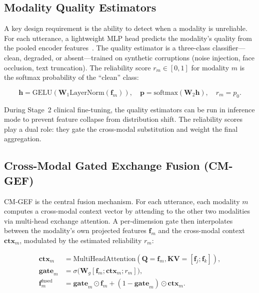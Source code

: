 \documentclass{article}
\begin{document}
\subsection{Modality Quality Estimators}

A key design requirement is the ability to detect when a modality is unreliable. For each
utterance, a lightweight MLP head predicts the modality's quality from the pooled encoder
features~\cite{amte2025}. The quality estimator is a three-class classifier---clean,
degraded, or absent---trained on synthetic corruptions (noise injection, face occlusion,
text truncation). The reliability score $r_m \in [0, 1]$ for modality $m$ is the
softmax probability of the ``clean'' class:

\begin{equation}
  \mathbf{h} = \text{GELU}(\mathbf{W}_1 \text{LayerNorm}(\mathbf{f}_m)),
  \quad
  \mathbf{p} = \text{softmax}(\mathbf{W}_2 \mathbf{h}),
  \quad
  r_m = p_0.
  \label{eq:quality}
\end{equation}

During Stage~2 clinical fine-tuning, the quality estimators can be run in inference mode
to prevent feature collapse from distribution shift. The reliability scores play a dual
role: they gate the cross-modal substitution and weight the final aggregation.

\subsection{Cross-Modal Gated Exchange Fusion (CM-GEF)}
\label{sec:cmgef}

CM-GEF is the central fusion mechanism. For each utterance, each modality $m$ computes a
cross-modal context vector by attending to the other two modalities via multi-head exchange
attention. A per-dimension gate then interpolates between the modality's own projected
features $\mathbf{f}_m$ and the cross-modal context $\mathbf{ctx}_m$, modulated by the
estimated reliability $r_m$:

\begin{align}
  \mathbf{ctx}_m &= \text{MultiHeadAttention}(\mathbf{Q}=\mathbf{f}_m,
                    \mathbf{KV}=[\mathbf{f}_j; \mathbf{f}_k]),
  \label{eq:exchange}\\
  \mathbf{gate}_m &= \sigma\big(\mathbf{W}_g[\mathbf{f}_m; \mathbf{ctx}_m; r_m]\big),
  \label{eq:gate}\\
  \mathbf{f}_m^{\text{fused}} &= \mathbf{gate}_m \odot \mathbf{f}_m
                               + (1 - \mathbf{gate}_m) \odot \mathbf{ctx}_m.
  \label{eq:substitution}
\end{align}
\end{document}
